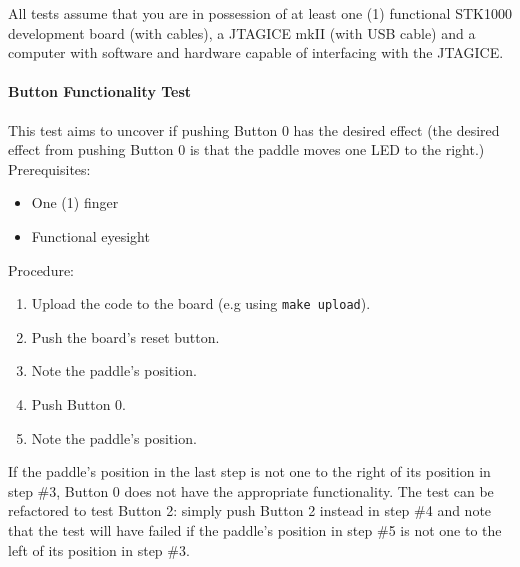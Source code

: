 All tests assume that you are in possession of at least one (1) functional STK1000 development board (with cables), a JTAGICE mkII (with USB cable) and a computer with software and hardware capable of interfacing with the JTAGICE.
\paragraph{Button Functionality Test}
This test aims to uncover if pushing Button 0 has the desired effect (the desired effect from pushing Button 0 is that the paddle moves one LED to the right.)
\\ Prerequisites:
\begin{itemize}
	\item One (1) finger
	\item Functional eyesight
\end{itemize}
Procedure:
\begin{enumerate}
	\item Upload the code to the board (e.g using \texttt{make upload}).
	\item Push the board's reset button.
	\item Note the paddle's position.
	\item Push Button 0.
	\item Note the paddle's position.
\end{enumerate}
If the paddle's position in the last step is not one to the right of its position in step \#3, Button 0 does not have the appropriate functionality.
The test can be refactored to test Button 2: simply push Button 2 instead in step \#4 and note that the test will have failed if the paddle's position in step \#5 is not one to the left of its position in step \#3.

